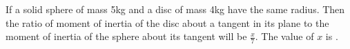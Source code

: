 \item If a solid sphere of mass 5kg and a disc of mass 4kg have the same radius. Then the ratio of moment of inertia of the disc about a tangent in its plane to the moment of inertia of the sphere about its tangent will be $\frac{x}{7}$. The value of $x$ is \underline{\hspace{2.5cm}}.
